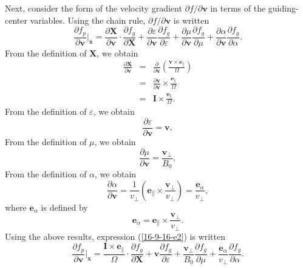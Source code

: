 \documentclass{llncs}
\newcommand{\nobracket}{}
\newcommand{\tmmathbf}[1]{\ensuremath{\boldsymbol{#1}}}
\begin{document}
Next, consider the form of the velocity gradient $\partial f / \partial
\mathbf{v}$ in terms of the guiding-center variables. Using the chain rule,
$\partial f / \partial \mathbf{v}$ is written
\begin{equation}
  \label{16-9-16-e2} \frac{\partial f_p}{\partial \mathbf{v}} |_{\mathbf{x}}
  \nobracket = \frac{\partial \mathbf{X}}{\partial \mathbf{v}} \cdot
  \frac{\partial f_g}{\partial \mathbf{X}} + \frac{\partial
  \varepsilon}{\partial \mathbf{v}}  \frac{\partial f_g}{\partial \varepsilon}
  + \frac{\partial \mu}{\partial \mathbf{v}}  \frac{\partial f_g}{\partial
  \mu} + \frac{\partial \alpha}{\partial \mathbf{v}}  \frac{\partial
  f_g}{\partial \alpha} .
\end{equation}
From the definition of $\mathbf{X}$, we obtain
\begin{eqnarray}
  \frac{\partial \mathbf{X}}{\partial \mathbf{v}} & = &
  \frac{\partial}{\partial \mathbf{v}} \left( \frac{\tmmathbf{v} \times
  \tmmathbf{e}_{\parallel}}{\Omega} \right) \nonumber\\
  & = &  \frac{\partial \mathbf{v}}{\partial \mathbf{v}} \times
  \frac{\tmmathbf{e}_{\parallel}}{\Omega} \nonumber\\
  & = & \mathbf{I} \times \frac{\tmmathbf{e}_{\parallel}}{\Omega} . 
\end{eqnarray}
From the definition of $\varepsilon$, we obtain
\begin{equation}
  \frac{\partial \varepsilon}{\partial \mathbf{v}} =\mathbf{v},
\end{equation}
From the definition of $\mu$, we obtain
\begin{equation}
  \frac{\partial \mu}{\partial \mathbf{v}} = \frac{\mathbf{v}_{\perp}}{B_0},
\end{equation}
From the definition of $\alpha$, we obtain
\begin{equation}
  \frac{\partial \alpha}{\partial \mathbf{v}} = \frac{1}{v_{\perp}} \left(
  \tmmathbf{e}_{\parallel} \times \frac{\mathbf{v}_{\perp}}{v_{\perp}} \right)
  = \frac{\tmmathbf{e}_{\alpha}}{v_{\perp}},
\end{equation}
where $\mathbf{e}_{\alpha}$ is defined by
\begin{equation}
  \tmmathbf{e}_{\alpha} = \tmmathbf{e}_{\parallel} \times
  \frac{\mathbf{v}_{\perp}}{v_{\perp}} .
\end{equation}
Using the above results, expression (\ref{16-9-16-e2}) is written
\begin{equation}
  \frac{\partial f_p}{\partial \mathbf{v}} |_{\mathbf{x}} \nobracket =
  \frac{\mathbf{I} \times \tmmathbf{e}_{\parallel}}{\Omega} \cdot
  \frac{\partial f_g}{\partial \mathbf{X}} +\mathbf{v} \frac{\partial
  f_g}{\partial \varepsilon} + \frac{\mathbf{v}_{\perp}}{B_0} \frac{\partial
  f_g}{\partial \mu} + \frac{\tmmathbf{e}_{\alpha}}{v_{\perp}}  \frac{\partial
  f_g}{\partial \alpha} .
\end{equation}
\end{document}
